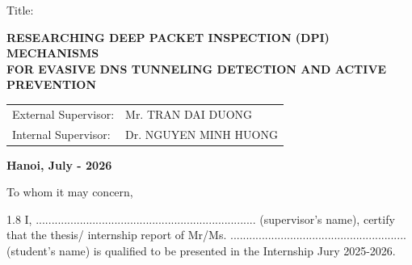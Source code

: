\documentclass[14pt, a4paper, oneside]{report}
\renewcommand{\headrulewidth}{0.4pt}
\begin{document}
\begin{titlepage}
\begin{center}
        \vspace{1cm}
        
        {\large Title:} \\[0.1cm]
        \begin{minipage}{\textwidth}
            \centering
            \Large\bfseries RESEARCHING DEEP PACKET INSPECTION (DPI) MECHANISMS \\ 
            FOR EVASIVE DNS TUNNELING DETECTION AND ACTIVE PREVENTION
        \end{minipage}
        
            
            \vspace{4cm}
            
            \begin{tabular}{ll}
                { External Supervisor:} & Mr. TRAN DAI DUONG\\
                { Internal Supervisor:} & Dr. NGUYEN MINH HUONG\\
            \end{tabular}
        
        
        \vspace{5cm}
        
        {\large\bfseries Hanoi, July - 2026}
    \end{center}
\end{titlepage}
\restoregeometry %
\clearpage


\renewcommand{\headrulewidth}{0pt}

\begin{center}
\large To whom it may concern, \\
\end{center}

\begin{spacing}{1.8}
\justifying %
\large I, ...................................................................... (supervisor’s name), certify that the thesis/ internship report of Mr/Ms. ...................................\allowbreak..................... (student’s name) is qualified to be presented in the Internship Jury 2025-2026.
\vspace{1.5cm}
\end{spacing}
\end{document}
